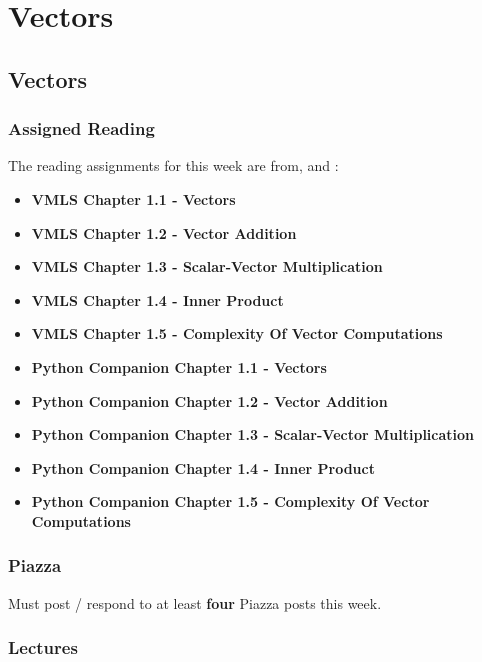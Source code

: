 \clearpage

\newcommand{\ChapTitle}{Vectors}
\newcommand{\SectionTitle}{Vectors}

\chapter{\ChapTitle}
\section{\SectionTitle}

\subsection{Assigned Reading}

The reading assignments for this week are from, \VMLS \hspace*{1pt} and \PyCap:

\begin{itemize}
    \item \textbf{VMLS Chapter 1.1 - Vectors}
    \item \textbf{VMLS Chapter 1.2 - Vector Addition}
    \item \textbf{VMLS Chapter 1.3 - Scalar-Vector Multiplication}
    \item \textbf{VMLS Chapter 1.4 - Inner Product}
    \item \textbf{VMLS Chapter 1.5 - Complexity Of Vector Computations}
    \item \textbf{Python Companion Chapter 1.1 - Vectors}
    \item \textbf{Python Companion Chapter 1.2 - Vector Addition}
    \item \textbf{Python Companion Chapter 1.3 - Scalar-Vector Multiplication}
    \item \textbf{Python Companion Chapter 1.4 - Inner Product}
    \item \textbf{Python Companion Chapter 1.5 - Complexity Of Vector Computations}
\end{itemize}

\subsection{Piazza}

Must post / respond to at least \textbf{four} Piazza posts this week.

\subsection{Lectures}

